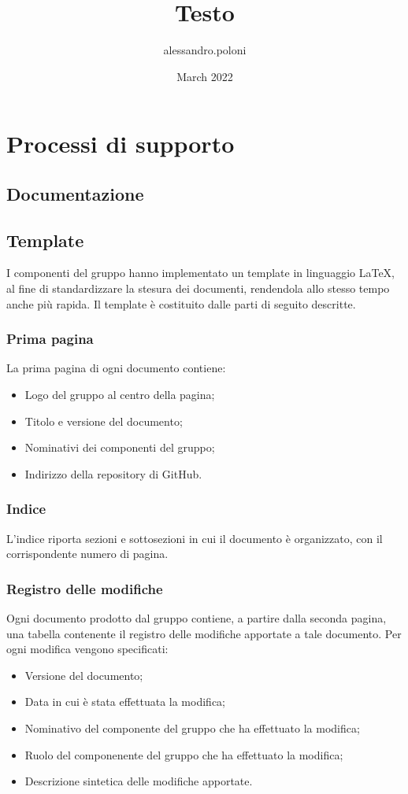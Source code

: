 \documentclass{article}
\title{Testo}
\author{alessandro.poloni }
\date{March 2022}
\begin{document}
\maketitle

\section{Processi di supporto}
\subsection{Documentazione}
\subsection{Template}
I componenti del gruppo hanno implementato un template in linguaggio \LaTeX, al fine di standardizzare la stesura dei documenti, rendendola allo stesso tempo anche più rapida. Il template è costituito dalle parti di seguito descritte.
\subsubsection{Prima pagina}
La prima pagina di ogni documento contiene:
\begin{itemize}
    \item Logo del gruppo al centro della pagina;
    \item Titolo e versione del documento;
    \item Nominativi dei componenti del gruppo;
    \item Indirizzo della repository di GitHub.
\end{itemize}
\subsubsection{Indice}
L'indice riporta sezioni e sottosezioni in cui il documento è organizzato, con il corrispondente numero di pagina.
\subsubsection{Registro delle modifiche}
Ogni documento prodotto dal gruppo contiene, a partire dalla seconda pagina, una tabella contenente il registro delle modifiche apportate a tale documento. Per ogni modifica vengono specificati:
\begin{itemize}
    \item Versione del documento;
    \item Data in cui è stata effettuata la modifica;
    \item Nominativo del componente del gruppo che ha effettuato la modifica;
    \item Ruolo del componenente del gruppo che ha effettuato la modifica;
    \item Descrizione sintetica delle modifiche apportate.
\end{itemize}
\end{document}
